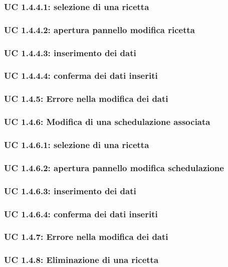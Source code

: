 \subsubsection{UC 1.4.4.1: selezione di una ricetta}
\subsubsection{UC 1.4.4.2: apertura pannello modifica ricetta}
\subsubsection{UC 1.4.4.3: inserimento dei dati}
\subsubsection{UC 1.4.4.4: conferma dei dati inseriti}
\subsubsection{UC 1.4.5: Errore nella modifica dei dati}
\subsubsection{UC 1.4.6: Modifica di una schedulazione associata}
\subsubsection{UC 1.4.6.1: selezione di una ricetta}
\subsubsection{UC 1.4.6.2: apertura pannello modifica schedulazione}
\subsubsection{UC 1.4.6.3: inserimento dei dati}
\subsubsection{UC 1.4.6.4: conferma dei dati inseriti}
\subsubsection{UC 1.4.7: Errore nella modifica dei dati}

\subsubsection{UC 1.4.8: Eliminazione di una ricetta}

